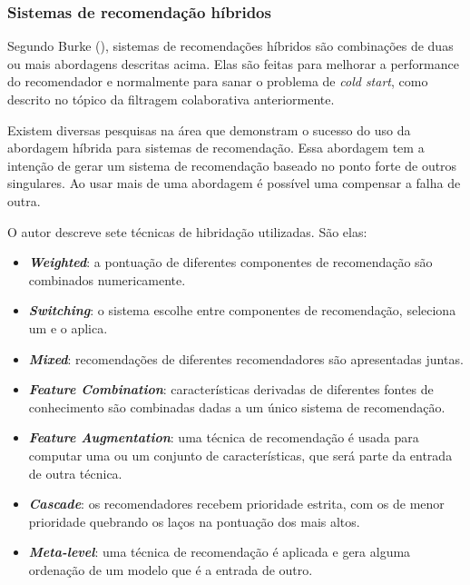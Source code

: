 \subsubsection{Sistemas de recomendação híbridos}
\label{Hybrid}
Segundo Burke (\citeyear{Burke:2007}), sistemas de recomendações híbridos são combinações de duas ou mais abordagens descritas acima. Elas são feitas para melhorar a performance do recomendador e normalmente para sanar o problema de \textit{cold start}, como descrito no tópico da filtragem colaborativa anteriormente.

Existem diversas pesquisas na área que demonstram o sucesso do uso da abordagem híbrida para sistemas de recomendação. Essa abordagem tem a intenção de gerar um sistema de recomendação baseado no ponto forte de outros singulares. Ao usar mais de uma abordagem é possível uma compensar a falha de outra.

O autor descreve sete técnicas de hibridação utilizadas. São elas:

\begin{itemize}
    \item \textbf{\textit{Weighted}}: a pontuação de diferentes componentes de recomendação são combinados numericamente.
    
    \item \textbf{\textit{Switching}}: o sistema escolhe entre componentes de recomendação, seleciona um e o aplica.
    
    \item \textbf{\textit{Mixed}}: recomendações de diferentes recomendadores são apresentadas juntas.
    
    \item \textbf{\textit{Feature Combination}}: características derivadas de diferentes fontes de conhecimento são combinadas dadas a um único sistema de recomendação.
    
    \item \textbf{\textit{Feature Augmentation}}:  uma técnica de recomendação é usada para computar uma ou um conjunto de características, que será parte da entrada de outra técnica.
    
    \item \textbf{\textit{Cascade}}: os recomendadores recebem prioridade estrita, com os de menor prioridade quebrando os laços na pontuação dos mais altos.

    \item \textbf{\textit{Meta-level}}: uma técnica de recomendação é aplicada e gera alguma ordenação de um modelo que é a entrada de outro.

\end{itemize}

